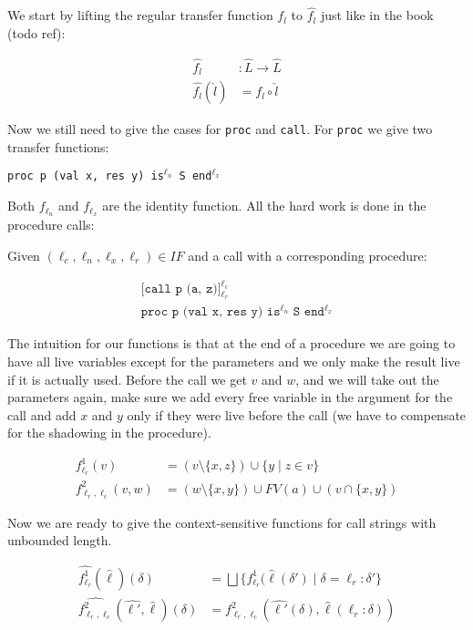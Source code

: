 \documentclass[a4wide,12pt]{article}
\theoremstyle{definition}
\theoremstyle{plain}
\theoremstyle{remark}
\begin{document}
We start by lifting the regular transfer function $f_l$ to $\widehat{f_l}$ just
like in the book (todo ref):

\begin{align}
\widehat{f_l} & : \widehat{L} \to \widehat {L} \\
\widehat{f_l} (\widehat{l}) & = f_l \circ \widehat{l}
\end{align}

Now we still need to give the cases for \texttt{proc} and \texttt{call}. For
\texttt{proc} we give two transfer functions:

\texttt{proc p (val x, res y) is$^{\ell_n}$ S end$^{\ell_x}$}

Both $f_{\ell_n}$ and $f_{\ell_x}$ are the identity function. All the hard work is
done in the procedure calls:

Given $(\ell_c, \ell_n, \ell_x, \ell_r) \in IF$ and a call with a corresponding
procedure:

\begin{align}
\texttt{[call p (a, z)]$^{\ell_c}_{\ell_r}$}\\
\texttt{proc p (val x, res y) is$^{\ell_n}$ S end$^{\ell_x}$}
\end{align}

The intuition for our functions is that at the end of a procedure we are going
to have all live variables except for the parameters and we only make the result
live if it is actually used. Before the call we get $v$ and $w$, and we will
take out the parameters again, make sure we add every free variable in the
argument for the call and add $x$ and $y$ only if they were live before the call
(we have to compensate for the shadowing in the procedure).
 
\begin{align}
f^1_{\ell_r} (v) & = (v \setminus \{x, z\}) \cup \{y \mid z \in v\} \\
f^2_{\ell_r, \ell_c} (v, w) & = (w \setminus \{x, y\}) \cup FV(a) \cup (v \cap \{x, y\})
\end{align}

Now we are ready to give the context-sensitive functions for call strings with
unbounded length.

\begin{align}
\widehat{f^1_{\ell_r}} (\widehat{\ell}) (\delta) & = \bigsqcup \{ f^1_{\ell_r} (\widehat{\ell}(\delta') \mid \delta = \ell_r : \delta' \} \\
\widehat{f^2_{\ell_r, \ell_c}} (\widehat{\ell'}, \widehat{\ell}) (\delta) & = f^2_{\ell_r, \ell_c} (\widehat{\ell'}(\delta), \widehat{\ell}(\ell_r : \delta))
\end{align}
\end{document}

